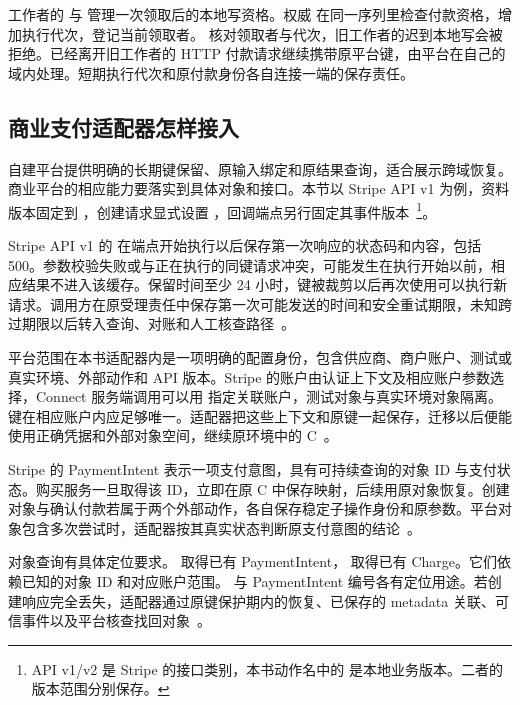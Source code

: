 
工作者的  与  管理一次领取后的本地写资格。权威  在同一序列里检查付款资格，增加执行代次，登记当前领取者。 核对领取者与代次，旧工作者的迟到本地写会被拒绝。已经离开旧工作者的 HTTP 付款请求继续携带原平台键，由平台在自己的域内处理。短期执行代次和原付款身份各自连接一端的保存责任。

\subsection{商业支付适配器怎样接入}

自建平台提供明确的长期键保留、原输入绑定和原结果查询，适合展示跨域恢复。商业平台的相应能力要落实到具体对象和接口。本节以 Stripe API v1 为例，资料版本固定到 ，创建请求显式设置 ，回调端点另行固定其事件版本~\cite{stripe-versioning}\footnote{API v1/v2 是 Stripe 的接口类别，本书动作名中的  是本地业务版本。二者的版本范围分别保存。}。

Stripe API v1 的  在端点开始执行以后保存第一次响应的状态码和内容，包括 500。参数校验失败或与正在执行的同键请求冲突，可能发生在执行开始以前，相应结果不进入该缓存。保留时间至少 24 小时，键被裁剪以后再次使用可以执行新请求。调用方在原受理责任中保存第一次可能发送的时间和安全重试期限，未知跨过期限以后转入查询、对账和人工核查路径~\cite{stripe-v1-idempotency}。

平台范围在本书适配器内是一项明确的配置身份，包含供应商、商户账户、测试或真实环境、外部动作和 API 版本。Stripe 的账户由认证上下文及相应账户参数选择，Connect 服务端调用可以用  指定关联账户，测试对象与真实环境对象隔离。键在相应账户内应足够唯一。适配器把这些上下文和原键一起保存，迁移以后便能使用正确凭据和外部对象空间，继续原环境中的 C~\cite{stripe-connect-scope}。

Stripe 的 PaymentIntent 表示一项支付意图，具有可持续查询的对象 ID 与支付状态。购买服务一旦取得该 ID，立即在原 C 中保存映射，后续用原对象恢复。创建对象与确认付款若属于两个外部动作，各自保存稳定子操作身份和原参数。平台对象包含多次尝试时，适配器按其真实状态判断原支付意图的结论~\cite{stripe-payment-intents}。

对象查询有具体定位要求。 取得已有 PaymentIntent， 取得已有 Charge。它们依赖已知的对象 ID 和对应账户范围。 与 PaymentIntent 编号各有定位用途。若创建响应完全丢失，适配器通过原键保护期内的恢复、已保存的 metadata 关联、可信事件以及平台核查找回对象~\cite{stripe-object-recovery}。

